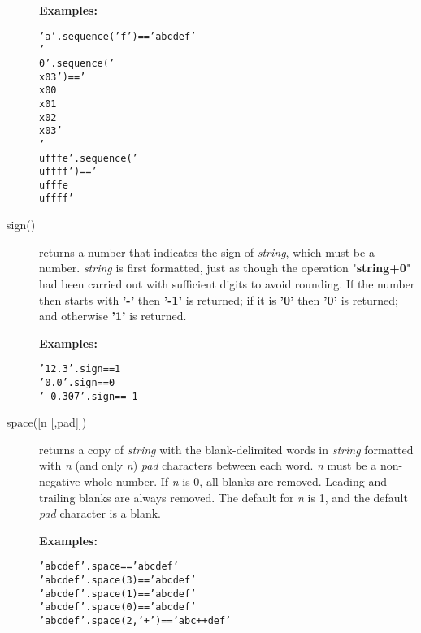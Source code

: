 \begin{description}
\textbf{Examples:}
\begin{alltt}
'a'.sequence('f')           == 'abcdef'
'\\0'.sequence('\\x03')       == '\\x00\\x01\\x02\\x03'
'\\ufffe'.sequence('\\uffff') == '\\ufffe\\uffff'
\end{alltt}

\item[sign()]\label{refsign}
returns a number that indicates the sign of \emph{string}, which
must be a number.
\emph{string} is first formatted, just as though the operation
"\textbf{string+0}" had been carried out with sufficient digits
to avoid rounding.
If the number then starts with \textbf{'-'} then \textbf{'-1'} is
returned; if it is \textbf{'0'} then \textbf{'0'} is returned; and
otherwise \textbf{'1'} is returned.
 
\textbf{Examples:}
\begin{alltt}
'12.3'.sign    ==  1
'0.0'.sign     ==  0
' -0.307'.sign == -1
\end{alltt}

\item[space([n [,pad{]]})]\label{refspace}
returns a copy of \emph{string} with the blank-delimited words in
\emph{string} formatted with \emph{n} (and only \emph{n})
\emph{pad} characters between each word.
\emph{n} must be a non-negative whole number.
If \emph{n} is 0, all blanks are removed.
Leading and trailing blanks are always removed.
The default for \emph{n} is 1, and the default \emph{pad}
character is a blank.
 
\textbf{Examples:}
\begin{alltt}
'abc  def  '.space        == 'abc def'
'  abc def '.space(3)     == 'abc   def'
'abc  def  '.space(1)     == 'abc def'
'abc  def  '.space(0)     == 'abcdef'
'abc  def  '.space(2,'+') == 'abc++def'
\end{alltt}


\end{description}
